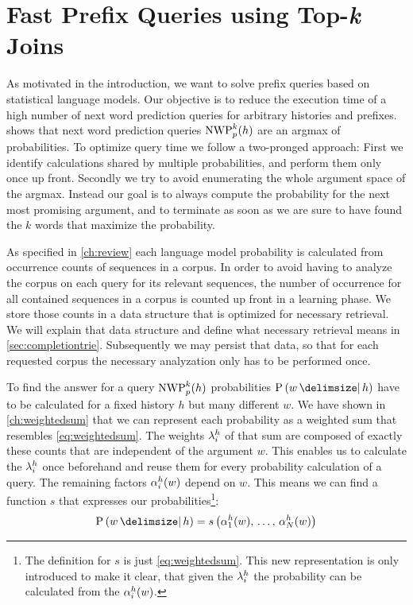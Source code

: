 \chapter{Fast Prefix Queries using Top-\emph{k} Joins}
\label{ch:topkjoin}


As motivated in the introduction, we want to solve prefix queries based
on statistical language models.
Our objective is to reduce the execution time of a high number of next word
prediction queries for arbitrary histories and prefixes.
 shows that next word prediction queries $\NWP[p][k](h)$
are an argmax of probabilities.
To optimize query time we follow a two-pronged approach:
First we identify calculations shared by multiple probabilities, and perform
them only once up front.
Secondly we try to avoid enumerating the whole argument space of the argmax.
Instead our goal is to always compute the probability for the next most
promising argument, and to terminate as soon as we are sure to have found the
$k$ words that maximize the probability.

As specified in \cref{ch:review} each language model probability  is calculated
from occurrence counts of sequences in a corpus.
In order to avoid having to analyze the corpus on each query for its relevant
sequences, the number of occurrence for all contained sequences in a corpus is
counted up front in a learning phase.
We store those counts in a data structure that is optimized for necessary
retrieval.
We will explain that data structure and define what necessary retrieval means
in \cref{sec:completiontrie}.
Subsequently we may persist that data, so that for each requested corpus the
necessary analyzation only has to be performed once.

To find the answer for a query $\NWP[p][k]{h}$ probabilities $\Prob{w}{h}$ have
to be calculated for a fixed history $h$ but many different $w$.
We have shown in \cref{ch:weightedsum} that we can represent each probability
as a weighted sum that resembles \cref{eq:weightedsum}.
The weights $\lambda^h_i$ of that sum are composed of exactly these counts
that are independent of the argument $w$.
This enables us to calculate the $\lambda_i^h$ once beforehand and reuse them
for every probability calculation of a query.
The remaining factors $\alpha^h_i(w)$ depend on $w$.
This means we can find a function $s$ that expresses our
probabilities\footnote{The definition for $s$ is just \cref{eq:weightedsum}.
This new representation is only introduced to make it clear, that given the
$\lambda^h_i$ the probability can be calculated from the $\alpha^h_i(w)$.}:
\begin{equation}
  \label{eq:scoringfunc}
  \Prob{w}{h} = s\left(\SumArg^h_1(w), \, \ldots, \, \SumArg^h_N(w)\right)
\end{equation}


